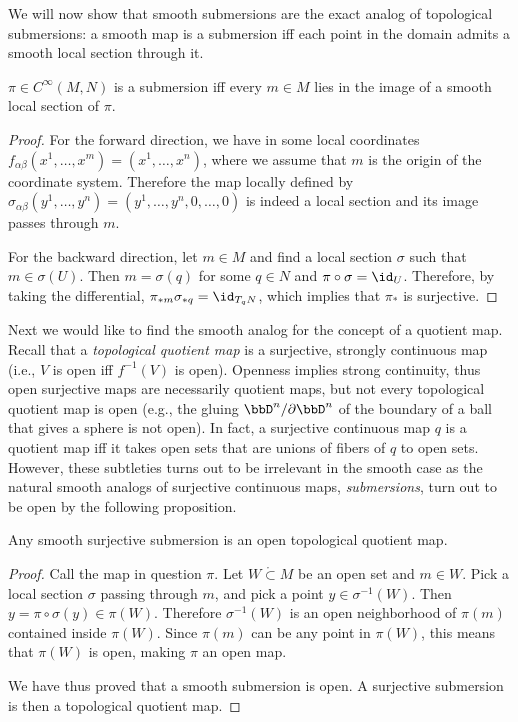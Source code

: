 We will now show that smooth submersions are the exact analog of topological submersions: a smooth map is a submersion iff each point in the domain admits a smooth local section through it.

\begin{thm}\label{thm: local section}
    $\pi\in C^\infty(M,N)$ is a submersion iff every $m\in M$ lies in the image of a smooth local section of $\pi$.
\end{thm}
\begin{proof}
    For the forward direction, we have in some local coordinates $f_{\alpha\beta}(x^1,\ldots,x^m)=(x^1,\ldots,x^n)$, where we assume that $m$ is the origin of the coordinate system. Therefore the map locally defined by $\sigma_{\alpha\beta}(y^1,\ldots,y^n)=(y^1,\ldots,y^n,0,\ldots,0)$ is indeed a local section and its image passes through $m$.
    
    For the backward direction, let $m\in M$ and find a local section $\sigma$ such that $m\in \sigma(U)$. Then $m=\sigma(q)$ for some $q\in N$ and $\pi\circ\sigma=\id_U$. Therefore, by taking the differential, $\pi_{\ast m} \sigma_{\ast q}=\id_{T_q N}$, which implies that $\pi_\ast$ is surjective.
    \end{proof}
    
    Next we would like to find the smooth analog for the concept of a quotient map. Recall that a \emph{topological quotient map} is a surjective, strongly continuous map (i.e., $V$ is open iff $f^{-1}(V)$ is open). Openness implies strong continuity, thus open surjective maps are necessarily quotient maps, but not every topological quotient map is open (e.g., the gluing $\bbD^n\slash \partial \bbD^n$ of the boundary of a ball that gives a sphere is not open). In fact, a surjective continuous map $q$ is a quotient map iff it takes open sets that are unions of fibers of $q$ to open sets. However, these subtleties turns out to be irrelevant in the smooth case as the natural smooth analogs of surjective continuous maps, \emph{submersions}, turn out to be open by the following proposition.
    
    \begin{prop}\label{thm submersions are open quotient maps}
    Any smooth surjective submersion is an open topological quotient map.
    \end{prop}
\begin{proof}
Call the map in question $\pi$. Let $W\mathring{\subset} M$ be an open set and $m\in W$. Pick a local section $\sigma $ passing through $m$, and pick a point $y\in \sigma^{-1}(W)$. Then $y=\pi\circ\sigma(y)\in\pi(W)$. Therefore $\sigma^{-1}(W)$ is an open neighborhood of $\pi(m)$ contained inside $\pi(W)$. Since $\pi(m)$ can be any point in $\pi(W)$, this means that $\pi(W)$ is open, making $\pi$ an open map.

We have thus proved that a smooth submersion is open. A surjective submersion is then a topological quotient map.
\end{proof}

